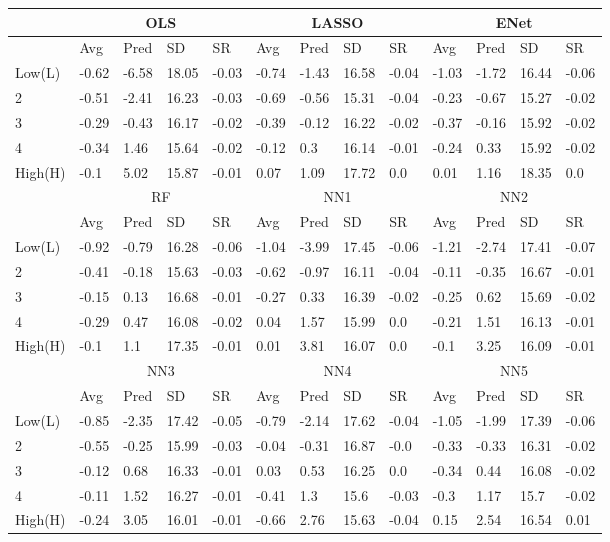 \begin{tabularx}{\linewidth}{*{13}{X}}
 & \multicolumn{4}{c}{OLS} & \multicolumn{4}{c}{LASSO} & \multicolumn{4}{c}{ENet}\\
\hline
& Avg & Pred & SD & SR & Avg & Pred & SD & SR & Avg & Pred & SD & SR \\
\hline
Low(L)& -0.62& -6.58& 18.05& -0.03& -0.74& -1.43& 16.58& -0.04& -1.03& -1.72& 16.44& -0.06\\
2& -0.51& -2.41& 16.23& -0.03& -0.69& -0.56& 15.31& -0.04& -0.23& -0.67& 15.27& -0.02\\
3& -0.29& -0.43& 16.17& -0.02& -0.39& -0.12& 16.22& -0.02& -0.37& -0.16& 15.92& -0.02\\
4& -0.34& 1.46& 15.64& -0.02& -0.12& 0.3& 16.14& -0.01& -0.24& 0.33& 15.92& -0.02\\
High(H)& -0.1& 5.02& 15.87& -0.01& 0.07& 1.09& 17.72& 0.0& 0.01& 1.16& 18.35& 0.0\\
\hline
 & \multicolumn{4}{c}{RF} & \multicolumn{4}{c}{NN1} & \multicolumn{4}{c}{NN2}\\
\hline
& Avg & Pred & SD & SR & Avg & Pred & SD & SR & Avg & Pred & SD & SR \\
\hline
Low(L)& -0.92& -0.79& 16.28& -0.06& -1.04& -3.99& 17.45& -0.06& -1.21& -2.74& 17.41& -0.07\\
2& -0.41& -0.18& 15.63& -0.03& -0.62& -0.97& 16.11& -0.04& -0.11& -0.35& 16.67& -0.01\\
3& -0.15& 0.13& 16.68& -0.01& -0.27& 0.33& 16.39& -0.02& -0.25& 0.62& 15.69& -0.02\\
4& -0.29& 0.47& 16.08& -0.02& 0.04& 1.57& 15.99& 0.0& -0.21& 1.51& 16.13& -0.01\\
High(H)& -0.1& 1.1& 17.35& -0.01& 0.01& 3.81& 16.07& 0.0& -0.1& 3.25& 16.09& -0.01\\
\hline
 & \multicolumn{4}{c}{NN3} & \multicolumn{4}{c}{NN4} & \multicolumn{4}{c}{NN5}\\
\hline
& Avg & Pred & SD & SR & Avg & Pred & SD & SR & Avg & Pred & SD & SR \\
\hline
Low(L)& -0.85& -2.35& 17.42& -0.05& -0.79& -2.14& 17.62& -0.04& -1.05& -1.99& 17.39& -0.06\\
2& -0.55& -0.25& 15.99& -0.03& -0.04& -0.31& 16.87& -0.0& -0.33& -0.33& 16.31& -0.02\\
3& -0.12& 0.68& 16.33& -0.01& 0.03& 0.53& 16.25& 0.0& -0.34& 0.44& 16.08& -0.02\\
4& -0.11& 1.52& 16.27& -0.01& -0.41& 1.3& 15.6& -0.03& -0.3& 1.17& 15.7& -0.02\\
High(H)& -0.24& 3.05& 16.01& -0.01& -0.66& 2.76& 15.63& -0.04& 0.15& 2.54& 16.54& 0.01\\
\hline
\end{tabularx}